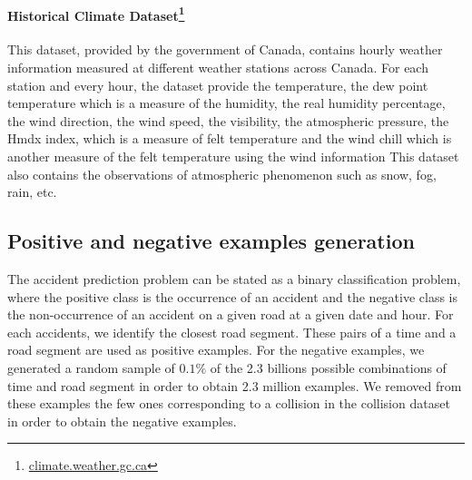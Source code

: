 \documentclass[conference]{IEEEtran}
\begin{document}
\paragraph{Historical Climate Dataset\protect\footnote{\url{climate.weather.gc.ca}}}

This dataset, provided by the government of Canada, contains hourly weather
information measured at different weather stations across Canada. For each
station and every hour, the dataset provide the temperature, the dew point
temperature which is a measure of the humidity, the real humidity percentage,
the wind direction, the wind speed, the visibility, the atmospheric pressure,
the Hmdx index, which is a measure of felt temperature and the wind chill 
which is another measure of the felt temperature using the wind information
This dataset also contains the observations of atmospheric phenomenon such
as snow, fog, rain, etc.

\subsection{Positive and negative examples generation}

The accident prediction problem can be stated as a binary classification
problem, where the positive class is the occurrence of an accident and the
negative class is the non-occurrence of an accident on a given road at a
given date and hour. For each accidents, we identify the
closest road segment. These pairs of a time and a road segment are used as
positive examples. For the negative examples, we generated a random sample
of $0.1\%$ of the 2.3 billions possible combinations of time and road segment
in order to obtain 2.3 million examples. We removed from these examples the few
ones corresponding to a collision in the collision dataset in order to obtain
the negative examples.
\end{document}
